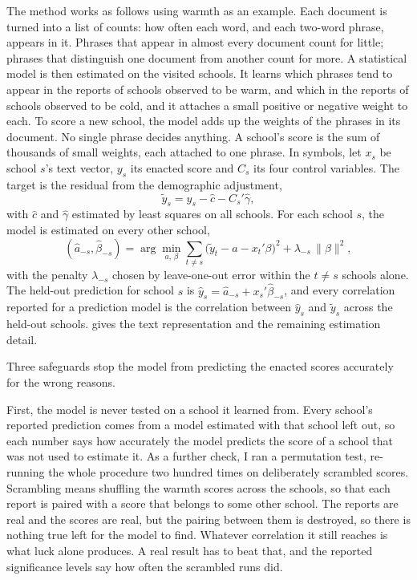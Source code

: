 The method works as follows using warmth as an example. Each document is turned into a
list of counts:
how often each word, and each two-word phrase, appears in it. Phrases that
appear in almost every document count for little; phrases that distinguish
one document from another count for more. A statistical model is then estimated on the visited schools. It learns which phrases tend to appear in
the reports of schools observed to be warm, and which in the reports of
schools observed to be cold, and it attaches a small positive or negative
weight to each. To score a new school, the model adds up the weights of the
phrases in its document. No single phrase decides anything. A school's
score is the sum of thousands of small weights, each attached to one phrase. In symbols, let $x_s$ be school $s$'s text vector, $y_s$ its enacted
score and $C_s$ its four control variables. The target is the residual
from the demographic adjustment,
%
\begin{equation}
  \tilde{y}_s = y_s - \hat{c} - C_s'\hat{\gamma},
  \label{eq:p1_deconf}
\end{equation}
%
with $\hat{c}$ and $\hat{\gamma}$ estimated by least squares on all
schools. For each school $s$, the model is estimated on every other school,
%
\begin{equation}
  (\hat{a}_{-s}, \hat{\beta}_{-s})
  = \arg\min_{a,\,\beta}
    \sum_{t \neq s} \bigl(\tilde{y}_t - a - x_t'\beta\bigr)^2
    + \lambda_{-s}\,\lVert\beta\rVert^2,
  \label{eq:p1_ridge}
\end{equation}
%
with the penalty $\lambda_{-s}$ chosen by leave-one-out error within the
$t \neq s$ schools alone. The held-out prediction for school $s$ is
$\hat{y}_s = \hat{a}_{-s} + x_s'\hat{\beta}_{-s}$, and every correlation
reported for a prediction model is the correlation between $\hat{y}_s$
and $\tilde{y}_s$ across the held-out schools.
 gives the text representation and the remaining estimation detail.

Three safeguards stop the model from predicting the enacted scores accurately for the wrong reasons.

First, the model is never tested on a school it learned from. Every school's reported
prediction comes from a model estimated with that school left out, so each number says how accurately the model predicts the score of a school that was not used to estimate it.
As a further check, I ran a permutation test, re-running the whole procedure two hundred times on deliberately scrambled scores. Scrambling means shuffling the warmth scores across the schools, so that each report is paired with a score that belongs to some other school. The reports are real and the scores are real, but the pairing between them is destroyed, so there is nothing true left for the model to find. Whatever correlation it still reaches is what luck alone produces. A real result has to beat that, and the reported significance levels say how often the scrambled runs did.

